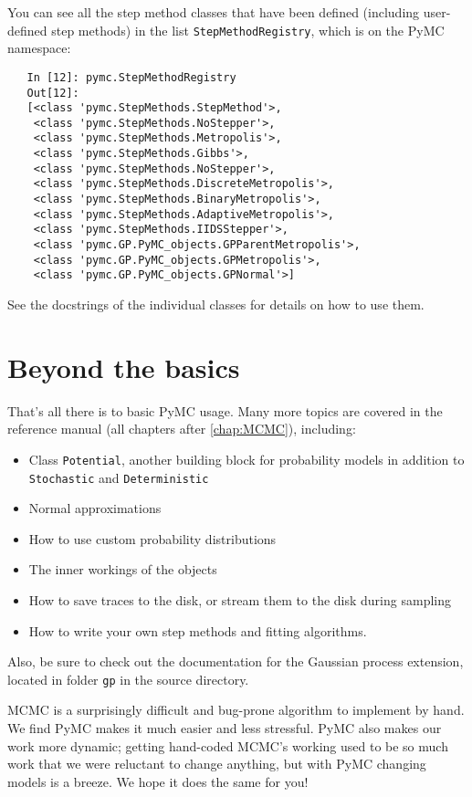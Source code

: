 You can see all the step method classes that have been defined (including user-defined step methods) in the list \texttt{StepMethodRegistry}, which is on the PyMC namespace: 
\begin{verbatim}
   In [12]: pymc.StepMethodRegistry
   Out[12]: 
   [<class 'pymc.StepMethods.StepMethod'>,
    <class 'pymc.StepMethods.NoStepper'>,
    <class 'pymc.StepMethods.Metropolis'>,
    <class 'pymc.StepMethods.Gibbs'>,
    <class 'pymc.StepMethods.NoStepper'>,
    <class 'pymc.StepMethods.DiscreteMetropolis'>,
    <class 'pymc.StepMethods.BinaryMetropolis'>,
    <class 'pymc.StepMethods.AdaptiveMetropolis'>,
    <class 'pymc.StepMethods.IIDSStepper'>,
    <class 'pymc.GP.PyMC_objects.GPParentMetropolis'>,
    <class 'pymc.GP.PyMC_objects.GPMetropolis'>,
    <class 'pymc.GP.PyMC_objects.GPNormal'>]
\end{verbatim}
See the docstrings of the individual classes for details on how to use them.

\section*{Beyond the basics}
That's all there is to basic PyMC usage. Many more topics are covered in the reference manual (all chapters after \ref{chap:MCMC}), including:
\begin{itemize}
   \item Class \texttt{Potential}, another building block for probability models in addition to \texttt{Stochastic} and \texttt{Deterministic}
   \item Normal approximations
   \item How to use custom probability distributions
   \item The inner workings of the objects
   \item How to save traces to the disk, or stream them to the disk during sampling
   \item How to write your own step methods and fitting algorithms.
\end{itemize}
Also, be sure to check out the documentation for the Gaussian process extension, located in folder \texttt{gp} in the source directory. 

\bigskip
MCMC is a surprisingly difficult and bug-prone algorithm to implement by hand. We find PyMC makes it much easier and less stressful. PyMC also makes our work more dynamic; getting hand-coded MCMC's working used to be so much work that we were reluctant to change anything, but with PyMC changing models is a breeze. We hope it does the same for you!